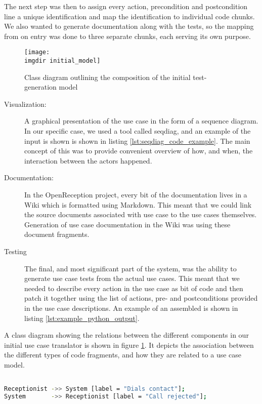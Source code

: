 \noindent The next step was then to assign every action, precondition and postcondition line a unique identification and map the identification to individual code chunks. We also wanted to generate documentation along with the tests, so the mapping from on entry was done to three separate chunks, each serving its own purpose.
\begin{figure}[!htbp]
\centering
\texttt{[image: \\imgdir initial\_model]}
\caption{Class diagram outlining the composition of the initial test-generation model}
\label{fig:first_generation_model}
\end{figure}
\begin{description}
  \item[Visualization:] A graphical presentation of the use case in the form of a sequence diagram. In our specific case, we used a tool called seqdiag, and an example of the input is shown is shown in listing \ref{lst:seqdiag_code_example}. The main concept of this was to provide convenient overview of how, and when, the interaction between the actors happened.
  \item[Documentation:] In the OpenReception project, every bit of the documentation lives in a Wiki which is formatted using Markdown. This meant that we could link the source documents associated with use case to the use cases themselves. Generation of use case documentation in the Wiki was using these document fragments.
  \item[Testing] The final, and most significant part of the system, was the ability to generate use case tests from the actual use cases. This meant that we needed to describe every action in the use case as bit of code and then patch it together using the list of actions, pre- and postconditions provided in the use case descriptions. An example of an assembled is shown in listing \ref{lst:example_python_output}.
\end{description}
\noindent
A class diagram showing the relations between the different components in our initial use case translator is shown in figure \ref{fig:first_generation_model}. It depicts the association between the different types of code fragments, and how they are related to a use case model.
\begin{lstlisting}[language=Bash, caption=Example seqdiag input fragment, label=lst:seqdiag_code_example]

Receptionist ->> System [label = "Dials contact"];
System       ->> Receptionist [label = "Call rejected"];
\end{lstlisting}

